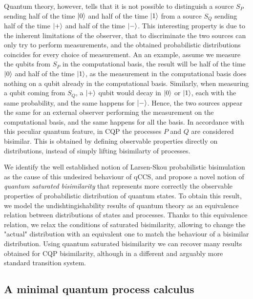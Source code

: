 Quantum theory, however, tells that it is not possible to distinguish a source $S_P$ sending half of the time $\ket{0}$ and half of the time $\ket{1}$ from a source $S_Q$ sending half of the time $\ket{+}$ and half of the time $\ket{-}$. This interesting property is due to the inherent limitations of the observer, that to discriminate the two sources can only try to perform measurements, and the obtained probabilistic distributions coincides for every choice of measurement. An an example, assume we measure the qubits from $S_P$ in the computational basis, the result will be half of the time $\ket{0}$ and half of the time $\ket{1}$, as the measurement in the computational basis does nothing on a qubit already in the computational basis. Similarly, when measuring a qubit coming from $S_Q$, a $\ket{+}$ qubit would decay in $\ket{0}$ or $\ket{1}$, each with the same probability, and the same happens for $\ket{-}$. Hence, the two sources appear the same for an external observer performing the measurement on the computational basis, and the same happens for all the basis. 
In accordance with this peculiar quantum feature, in CQP the processes $P$ and $Q$ are considered bisimilar. This is obtained by
defining observable properties directly on distributions, instead of simply lifting bisimilarty of processes.

We identify the well established notion of Larsen-Skou \cite{larsenBisimulationProbabilisticTesting1991} probabilistic bisimulation  as the cause of this undesired behaviour of qCCS, and propose a novel notion of \textit{quantum saturated bisimilarity} that represents more correctly the observable properties of probabilistic distribution of quantum states. To obtain this result, we model the undishtingishability results of quantum theory as an equivalence relation between distributions of states and processes.  
Thanks to this equivalence relation, we relax the conditions of saturated bisimilarity, allowing to change the "actual" distribution with an equivalent one to match the behaviour of a bisimilar distribution.
 Using quantum saturated bisimilarity we can recover many results obtained for CQP bisimilarity, although in a different and arguably more standard transition system.
 
 \subsection*{A minimal quantum process calculus}
 
